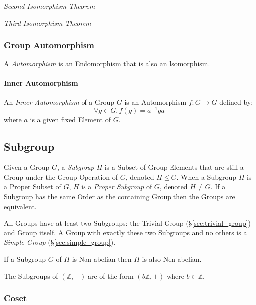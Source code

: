 \emph{Second Isomorphism Theorem}

\emph{Third Isomorphism Theorem}



\subsubsection{Group Automorphism}\label{sec:group_automorphism}

A \emph{Automorphism} is an Endomorphism that is also an Isomorphism.



\paragraph{Inner Automorphism}\label{sec:inner_automorphism}\hfill

An \emph{Inner Automorphism} of a Group $G$ is an Automorphism $f : G
\rightarrow G$ defined by:
\[
    \forall g \in G, f(g) = a^{-1}ga
\]
where $a$ is a given fixed Element of $G$.



\subsection{Subgroup}\label{sec:subgroup}

Given a Group $G$, a \emph{Subgroup} $H$ is a Subset of Group Elements
that are still a Group under the Group Operation of $G$, denoted $H
\leq G$. When a Subgroup $H$ is a Proper Subset of $G$, $H$ is a
\emph{Proper Subgroup} of $G$, denoted $H \neq G$. If a Subgroup has
the same Order as the containing Group then the Groups are equivalent.

All Groups have at least two Subgroups: the Trivial Group
(\S\ref{sec:trivial_group}) and Group itself. A Group with exactly
these two Subgroups and no others is a \emph{Simple Group}
(\S\ref{sec:simple_group}).

If a Subgroup $G$ of $H$ is Non-abelian then $H$ is also Non-abelian.

The Subgroups of $(\mathbb{Z},+)$ are of the form $(b\mathbb{Z},+)$
where $b \in \mathbb{Z}$.



\subsubsection{Coset}\label{sec:coset}

